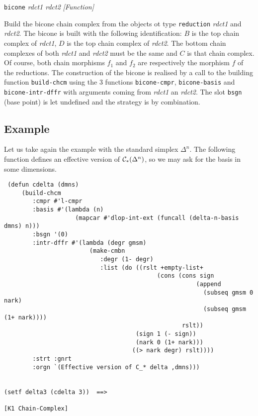 {\parindent=0mm
{\leftskip=5mm
{\tt bicone} {\em rdct1 rdct2} \hfill {\em [Function]} \par}
{\leftskip=15mm
Build the bicone chain complex from the objects ot type {\tt reduction} {\em rdct1} and {\em rdct2}.
The bicone is built with the following identification: $B$ is the top chain complex of {\em rdct1},
$D$ is the top chain complex of {\em rdct2}. The bottom chain complexes of both {\em rdct1} and {\em rdct2}
must be the same and $C$ is  that chain complex. Of course, both chain morphisms $f_1$ and
$f_2$ are respectively the morphism $f$ of the reductions. The construction of the bicone is realised
by a call to the building function {\tt build-chcm} using the $3$ functions {\tt bicone-cmpr},
{\tt bicone-basis} and {\tt bicone-intr-dffr} with arguments coming from {\em rdct1} an {\em rdct2}.
The slot {\tt bsgn} (base point) is let undefined and the strategy is by combination. \par}

\subsection* {Example}

Let us take again the example with the standard simplex $\Delta^n$. The following function
defines an effective version of ${\cal C}_*(\Delta^n)$, so we may ask for the basis in some dimensions.
{\footnotesize\begin{verbatim}
 (defun cdelta (dmns)
     (build-chcm
        :cmpr #'l-cmpr
        :basis #'(lambda (n)
                    (mapcar #'dlop-int-ext (funcall (delta-n-basis dmns) n)))
        :bsgn '(0)
        :intr-dffr #'(lambda (degr gmsm)
                        (make-cmbn
                           :degr (1- degr)
                           :list (do ((rslt +empty-list+
                                           (cons (cons sign
                                                      (append
                                                        (subseq gmsm 0 nark)
                                                        (subseq gmsm (1+ nark))))
                                                  rslt))
                                     (sign 1 (- sign))
                                     (nark 0 (1+ nark)))
                                    ((> nark degr) rslt))))
        :strt :gnrt
        :orgn `(Effective version of C_* delta ,dmns)))


(setf delta3 (cdelta 3))  ==>

[K1 Chain-Complex]


\end{verbatim}}}
